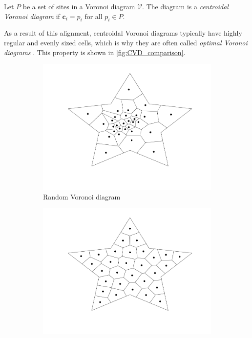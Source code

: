 \begin{definition}
Let $P$ be a set of sites in a Voronoi diagram $\mathcal{V}$. The diagram is a \emph{centroidal Voronoi diagram} if $\mathbf{c}_i = p_i$ for all $p_i \in P$.
\end{definition}

As a result of this alignment, centroidal Voronoi diagrams typically have highly regular and evenly sized cells, which is why they are often called \emph{optimal Voronoi diagrams} \cite{UPR_thesis}. This property is shown in \autoref{fig:CVD_comparison}.

\begin{figure}[ht]
    \centering
    \begin{subfigure}[b]{0.4\textwidth}
        \centering
        \includegraphics[width=\textwidth]{report/Images/Theory/voronoi/centroidal_voronoi_diagram_0.png}
        \caption{Random Voronoi diagram}
        \label{fig:notCVD}
    \end{subfigure}
    \begin{subfigure}[b]{0.4\textwidth}
        \centering
        \includegraphics[width=\textwidth]{report/Images/Theory/voronoi/centroidal_voronoi_diagram.png}

\end{subfigure}
\end{figure}
